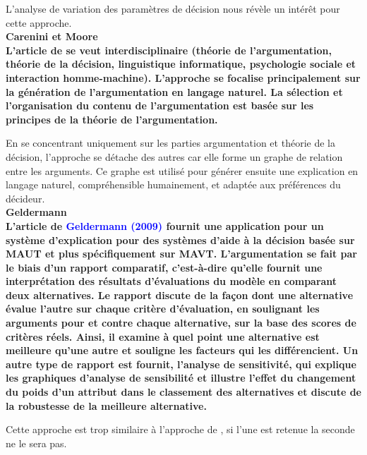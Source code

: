 \documentclass[a4paper, 11pt]{article}
\renewcommand{\textbf}[1]{\begingroup\bfseries\mathversion{bold}#1\endgroup}
\begin{document}
L'analyse de variation des paramètres de décision nous révèle un intérêt pour cette approche.\\




\noindent \textbf{Carenini et Moore}\\ %

L'article de \textcolor{blue}{\citep{CARENINI2006925}} se veut interdisciplinaire (théorie de l'argumentation, théorie de la décision, linguistique informatique, psychologie sociale et interaction homme-machine). L'approche se focalise principalement sur la génération de l'argumentation en langage naturel. La sélection et l'organisation du contenu de l'argumentation est basée sur les principes de la théorie de l'argumentation.

En se concentrant uniquement sur les parties argumentation et théorie de la décision, l'approche se détache des autres car elle forme un graphe de relation entre les arguments. Ce graphe est utilisé pour générer ensuite une explication en langage naturel, compréhensible humainement, et adaptée aux préférences du décideur.\\


\noindent \textbf{Geldermann}\\ %

L'article de \textcolor{blue}{Geldermann (2009)} fournit une application pour un système d'explication pour des systèmes d'aide à la décision basée sur MAUT et plus spécifiquement sur MAVT. L'argumentation se fait par le biais d'un rapport comparatif, c'est-à-dire qu'elle fournit une interprétation des résultats d'évaluations du modèle en comparant deux alternatives. Le rapport discute de la façon dont une alternative évalue l'autre sur chaque critère d'évaluation, en soulignant les arguments pour et contre chaque alternative, sur la base des scores de critères réels. Ainsi, il examine à quel point une alternative est meilleure qu'une autre et souligne les facteurs qui les différencient. Un autre type de rapport est fournit, l'analyse de sensitivité, qui explique les graphiques d'analyse de sensibilité et illustre l'effet du changement du poids d'un attribut dans le classement des alternatives et discute de la robustesse de la meilleure alternative.

Cette approche est trop similaire à l'approche de \textcolor{blue}{\citep{PAPAMICHAIL200335}}, si l'une est retenue la seconde ne le sera pas.\\ 
\end{document}
